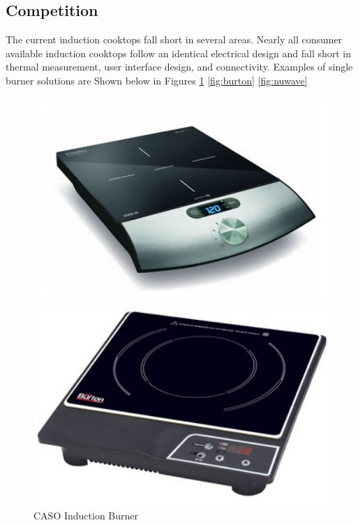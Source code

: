 \documentclass[11pt]{article}
\theoremstyle{definition}
\begin{document}
\subsection{Competition}
The current induction cooktops fall short in several areas. Nearly all consumer available induction cooktops follow an identical electrical design and fall short in thermal measurement, user interface design, and connectivity. Examples of single burner solutions are Shown below in Figures \ref{fig:caso} \ref{fig:burton} \ref{fig:nuwave}
\begin{center}
\begin{figure}
\begin{minipage}[t]{5cm}
\includegraphics[width=1.1\textwidth]{caso.png}
\caption{CASO Induction Burner}
\label{fig:caso}
\end{minipage}
\hfill
\begin{minipage}[t]{4cm}
\includegraphics[width=1.1\textwidth]{burton.png}

\end{minipage}
\end{figure}
\end{center}
\end{document}
